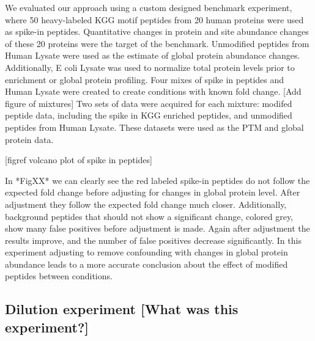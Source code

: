 \documentclass[mcp]{article}
\numberwithin{figure}{section} %
\numberwithin{table}{section}
\def\todo#1{{\color{red}[#1]}}
\begin{document}
We evaluated our approach using a custom designed benchmark experiment, where 50 heavy-labeled KGG motif peptides from 20 human proteins were used as spike-in peptides. Quantitative changes in protein and site abundance changes of these 20 proteins were the target of the benchmark. Unmodified peptides from Human Lysate were used as the estimate of global protein abundance changes. Additionally, E coli Lysate was used to normalize total protein levels prior to enrichment or global protein profiling. Four mixes of spike in peptides and Human Lysate were created to create conditions with known fold change. \todo{Add figure of mixtures} Two sets of data were acquired for each mixture: modifed peptide data, including the spike in KGG enriched peptides, and unmodified peptides from Human Lysate. These datasets were used as the PTM and global protein data.

\todo{figref volcano plot of spike in peptides}

In *FigXX* we can clearly see the red labeled spike-in peptides do not follow the expected fold change before adjusting for changes in global protein level. After adjustment they follow the expected fold change much closer. Additionally, background peptides that should not show a significant change, colored grey, show many false positives before adjustment is made. Again after adjustment the results improve, and the number of false positives decrease significantly. In this experiment adjusting to remove confounding with changes in global protein abundance leads to a more accurate conclusion about the effect of modified peptides between conditions.

\subsection*{Dilution experiment [What was this experiment?]}
\end{document}
